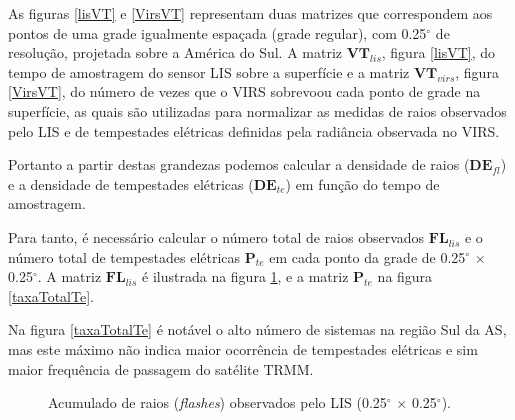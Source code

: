 As figuras  \ref{lisVT} e \ref{VirsVT} representam duas matrizes que correspondem aos pontos de uma grade igualmente espaçada (grade regular), com 0.25$^{\circ}$ de resolução, projetada sobre a América do Sul. A matriz $\mathbf{VT}_{lis}$, figura \ref{lisVT}, do tempo de amostragem do sensor LIS sobre a superfície e a matriz $\mathbf{VT}_{virs}$, figura \ref{VirsVT}, do número de vezes que o VIRS sobrevoou cada ponto de grade na superfície, as quais são utilizadas para normalizar as medidas de raios observados pelo LIS e de tempestades elétricas definidas pela radiância observada no VIRS.  


Portanto a partir destas grandezas podemos calcular a densidade de raios ($\mathbf{DE}_{fl}$) e a densidade de tempestades elétricas ($\mathbf{DE}_{te}$) em função do tempo de amostragem.

Para tanto, é necessário calcular o número total de raios observados $\mathbf{FL}_{lis}$ e o número total de tempestades elétricas $\mathbf{P}_{te}$ em cada ponto da grade de 0.25$^{\circ}$ $\times$ 0.25$^{\circ}$. A matriz $\mathbf{FL}_{lis}$ é ilustrada na figura \ref{taxatotalraios}, e a matriz $\mathbf{P}_{te}$ na figura \ref{taxaTotalTe}.


Na figura \ref{taxaTotalTe} é notável o alto número de sistemas na região Sul da AS, mas este máximo não indica maior ocorrência de tempestades elétricas e sim maior frequência de passagem do satélite TRMM. 


\begin{figure}[!ht]
  \centering
\caption{Acumulado de raios (\textit{flashes}) observados pelo LIS (0.25$^{\circ}$  $\times$ 0.25$^{\circ}$).}
\label{taxatotalraios}
\end{figure}   
  
